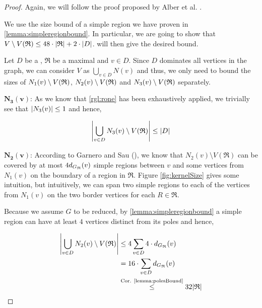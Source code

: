 \begin{proof}
    Again, we will follow the proof proposed by Alber et al. \cite[Proposition 2]{Alber2004}. 
    
    We use the size bound of a simple region we have proven in \cref{lemma:simpleregionbound}. In particular, we are going to show that $V \setminus V(\mathfrak{R}) \leq 48 \cdot \abs{\mathfrak{R}} + 2 \cdot \abs{D}$.  will then give the desired bound.
    
    Let $D$ be a \sdom, $\mathfrak{R}$ be a maximal \dreg and $v \in D$. Since $D$ dominates all vertices in the graph, we can consider $V$ as $\bigcup_{v \in D}N(v)$ and thus, we only need to bound the sizes of $N_1(v)\setminus {V(\mathfrak{R})} $, $N_2(v) \setminus {V(\mathfrak{R})} $ and $N_3(v) \setminus {V(\mathfrak{R})} $ separately.
    
    \noindent$\mathbf{N_3(v)}$: As we know that \cref{rgl:rone} has been exhaustively applied, we trivially see that $\abs{N_3(v)} \leq 1$ and hence, 
    
    \[\abs{\bigcup_{v \in D}N_3(v) \setminus V(\mathfrak{R})} \leq \abs{D}\]
    
    \noindent$\mathbf{N_2(v)}$: According to Garnero and Sau (\cite[Proposition 2]{Garnero2018}), we know that $N_2(v) \setminus V(\mathfrak{R})$ can be covered by at most $4 d_{G_{\mathfrak{R}}}(v)$ simple regions between $v$ and some vertices from $N_1(v)$ on the boundary of a region in $\mathfrak{R}$. Figure \ref{fig:kernelSize} gives some intuition, but intuitively, we can span two simple regions to each of the vertices from $N_1(v)$ on the two border vertices for each $R \in \mathfrak{R}$.
    
    Because we assume $G$ to be reduced, by \cref{lemma:simpleregionbound} a simple region can have at least $4$ vertices distinct from its poles and hence,
    
    \begin{equation}
        \begin{split}
            \abs{\bigcup_{v \in D} N_2(v) \setminus V(\mathfrak{R})} &\leq 4 \sum_{v \in D}4 \cdot d_{G_{\mathfrak{R}}}(v) \\
            &= 16 \cdot \sum_{v \in D}d_{G_{\mathfrak{R}}}(v) \\
            &\overset{\text{Cor. \ref{lemma:polesBound}}}{\leq} 32 \abs{\mathfrak{R}}
        \end{split}
    \end{equation}
    
    
    

\end{proof}
